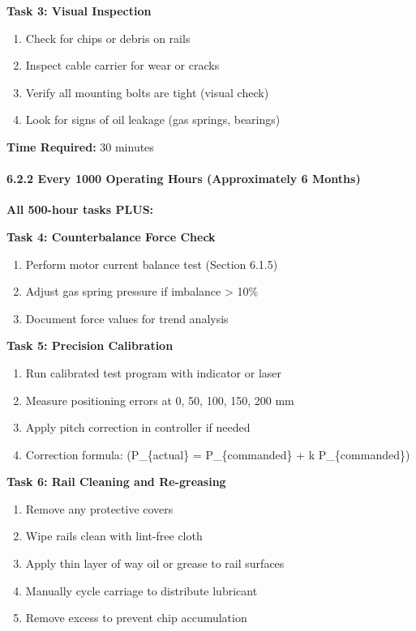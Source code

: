 \documentclass[
]{article}
\providecommand{\tightlist}{%
  \setlength{\itemsep}{0pt}\setlength{\parskip}{0pt}}
\begin{document}
\textbf{Task 3: Visual Inspection}

\begin{enumerate}
\def\labelenumi{\arabic{enumi}.}
\tightlist
\item
  Check for chips or debris on rails
\item
  Inspect cable carrier for wear or cracks
\item
  Verify all mounting bolts are tight (visual check)
\item
  Look for signs of oil leakage (gas springs, bearings)
\end{enumerate}

\textbf{Time Required:} 30 minutes

\paragraph{6.2.2 Every 1000 Operating Hours (Approximately 6
Months)}\label{every-1000-operating-hours-approximately-6-months}

\textbf{All 500-hour tasks PLUS:}

\textbf{Task 4: Counterbalance Force Check}

\begin{enumerate}
\def\labelenumi{\arabic{enumi}.}
\tightlist
\item
  Perform motor current balance test (Section 6.1.5)
\item
  Adjust gas spring pressure if imbalance \textgreater{} 10\%
\item
  Document force values for trend analysis
\end{enumerate}

\textbf{Task 5: Precision Calibration}

\begin{enumerate}
\def\labelenumi{\arabic{enumi}.}
\tightlist
\item
  Run calibrated test program with indicator or laser
\item
  Measure positioning errors at 0, 50, 100, 150, 200 mm
\item
  Apply pitch correction in controller if needed
\item
  Correction formula: (P\_\{actual\} = P\_\{commanded\} + k
  \times P\_\{commanded\})
\end{enumerate}

\textbf{Task 6: Rail Cleaning and Re-greasing}

\begin{enumerate}
\def\labelenumi{\arabic{enumi}.}
\tightlist
\item
  Remove any protective covers
\item
  Wipe rails clean with lint-free cloth
\item
  Apply thin layer of way oil or grease to rail surfaces
\item
  Manually cycle carriage to distribute lubricant
\item
  Remove excess to prevent chip accumulation
\end{enumerate}
\end{document}
